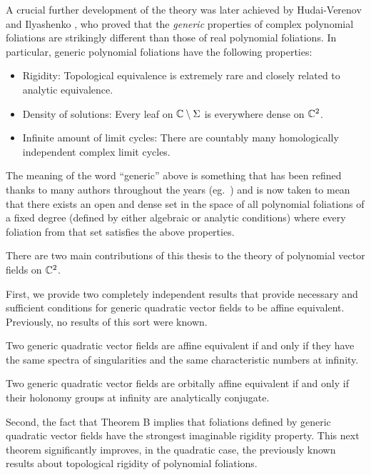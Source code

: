 \documentclass[phd,tocprelim]{cornell}
\begin{document}
A crucial further development of the theory was later achieved by Hudai-Verenov and Ilyashenko \cite{HudaiVerenov1962,Ilyashenko1978}, who proved that the \textit{generic} properties of complex polynomial foliations are strikingly different than those of real polynomial foliations. In particular, generic polynomial foliations have the following properties:
\begin{itemize}[topsep=0pt,noitemsep]
 \item Rigidity: Topological equivalence is extremely rare and closely related to analytic equivalence.
 \item Density of solutions: Every leaf on $\mathbb{C}\setminus\Sigma$ is everywhere dense on $\mathbb{C}^2$.
 \item Infinite amount of limit cycles: There are countably many homologically independent complex limit cycles.
\end{itemize}
The meaning of the word ``generic'' above is something that has been refined thanks to many authors throughout the years (eg.~\cite{Shcherbakov1984,Nakai1994,LinsNetoSadScardua1998}) and is now taken to mean that there exists an open and dense set in the space of all polynomial foliations of a fixed degree (defined by either algebraic or analytic conditions) where every foliation from that set satisfies the above properties.

\bigskip
\noindent There are two main contributions of this thesis to the theory of polynomial vector fields on $\mathbb{C}^2$.

First, we provide two completely independent results that provide necessary and sufficient conditions for generic quadratic vector fields to be affine equivalent. Previously, no results of this sort were known. 

\begin{prefthm}
 Two generic quadratic vector fields are affine equivalent if and only if they have the same spectra of singularities and the same characteristic numbers at infinity.
\end{prefthm}

\begin{prefthm}
 Two generic quadratic vector fields are orbitally affine equivalent if and only if their holonomy groups at infinity are analytically conjugate.
\end{prefthm}

Second, the fact that Theorem B implies that foliations defined by generic quadratic vector fields have the strongest imaginable rigidity property. This next theorem significantly improves, in the quadratic case, the previously known results about topological rigidity of polynomial foliations.
\end{document}
